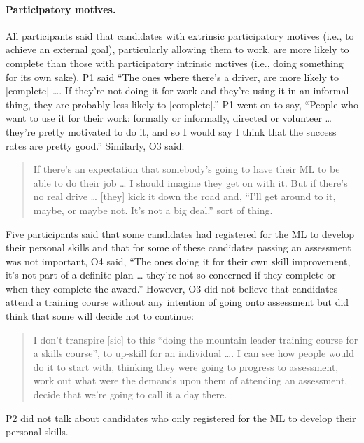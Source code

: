 \documentclass[a4paper,]{book}
\let\oldparagraph\paragraph
\renewcommand{\paragraph}[1]{\oldparagraph{#1}\mbox{}}
\begin{document}
\hypertarget{participatory-motives.}{%
\paragraph{Participatory motives.}\label{participatory-motives.}}

All participants said that candidates with extrinsic participatory motives (i.e., to achieve an external goal), particularly allowing them to work, are more likely to complete than those with participatory intrinsic motives (i.e., doing something for its own sake). P1 said ``The ones where there's a driver, are more likely to {[}complete{]} \ldots{}. If they're not doing it for work and they're using it in an informal thing, they are probably less likely to {[}complete{]}.'' P1 went on to say, ``People who want to use it for their work: formally or informally, directed or volunteer \ldots{} they're pretty motivated to do it, and so I would say I think that the success rates are pretty good.'' Similarly, O3 said:

\begin{quote}
If there's an expectation that somebody's going to have their ML to be able to do their job \ldots{} I should imagine they get on with it. But if there's no real drive \ldots{} {[}they{]} kick it down the road and, ``I'll get around to it, maybe, or maybe not. It's not a big deal.'' sort of thing.
\end{quote}

Five participants said that some candidates had registered for the ML to develop their personal skills and that for some of these candidates passing an assessment was not important, O4 said, ``The ones doing it for their own skill improvement, it's not part of a definite plan \ldots{} they're not so concerned if they complete or when they complete the award.'' However, O3 did not believe that candidates attend a training course without any intention of going onto assessment but did think that some will decide not to continue:

\begin{quote}
I don't transpire {[}sic{]} to this ``doing the mountain leader training course for a skills course'', to up-skill for an individual \ldots{}. I can see how people would do it to start with, thinking they were going to progress to assessment, work out what were the demands upon them of attending an assessment, decide that we're going to call it a day there.
\end{quote}

P2 did not talk about candidates who only registered for the ML to develop their personal skills.
\end{document}
